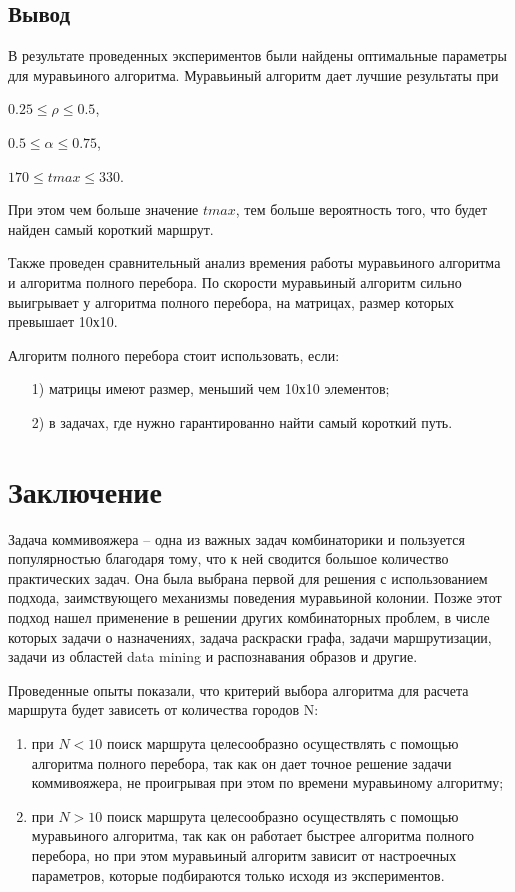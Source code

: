 \documentclass[12pt]{report}
\begin{document}
\section{Вывод}

В результате проведенных экспериментов были найдены оптимальные параметры для муравьиного алгоритма.
Муравьиный алгоритм дает лучшие результаты при 

$0.25 \leq  \rho \leq 0.5$,

$0.5 \leq  \alpha \leq 0.75$,

$170 \leq  tmax \leq 330$. 

\hfill

При этом чем больше значение $tmax$, тем больше вероятность того, что будет найден самый короткий маршрут. 

\hfill

Также проведен сравнительный анализ времения работы муравьиного алгоритма и алгоритма полного перебора.
По скорости муравьиный алгоритм сильно выигрывает у алгоритма полного перебора, на матрицах, размер которых превышает 10х10.

\hfill

Алгоритм полного перебора стоит использовать, если:
\begin{enumerate}
	\item[1)] матрицы имеют размер, меньший чем 10х10 элементов;
	\item[2)] в задачах, где нужно гарантированно найти самый короткий путь.
\end{enumerate}  


\chapter*{Заключение}

Задача коммивояжера -- одна из важных задач комбинаторики и пользуется популярностью благодаря тому, что к ней сводится большое количество практических задач. Она была выбрана первой для решения с использованием подхода, заимствующего механизмы поведения муравьиной колонии. Позже этот подход нашел применение в решении других комбинаторных проблем, в числе которых задачи о назначениях, задача раскраски графа, задачи маршрутизации, задачи из областей data mining и распознавания образов и другие.

Проведенные опыты показали, что критерий выбора алгоритма для расчета маршрута будет зависеть от количества городов N:
\begin{enumerate}
	\item при $N < 10$ поиск маршрута целесообразно осуществлять с помощью алгоритма полного перебора, так как он дает точное решение задачи коммивояжера, не проигрывая при этом по времени муравьиному алгоритму;
	\item при $N > 10$ поиск маршрута целесообразно осуществлять с помощью муравьиного алгоритма, так как он работает быстрее алгоритма полного перебора, но при этом муравьиный алгоритм зависит от настроечных параметров, которые подбираются только исходя из экспериментов.
\end{enumerate}
\end{document}
